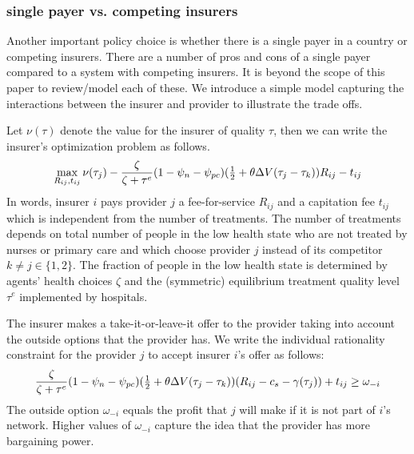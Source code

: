 \documentclass[12pt,english,a4paper]{article}
\begin{document}
\subsubsection{single payer vs. competing insurers}
\label{sec:orgcf517af}

Another important policy choice is whether there is a single payer in a country or competing insurers. There are a number of pros and cons of a single payer compared to a system with competing insurers. It is beyond the scope of this paper to review/model each of these. We introduce a simple model capturing the interactions between the insurer and provider to illustrate the trade offs.

Let \(\nu(\tau)\) denote the value for the insurer of quality \(\tau\), then we can write the insurer's optimization problem as follows.
\begin{equation}
\label{eq:36a}
\max_{R_{ij},t_{ij}} \nu(\tau_j) - \frac{\zeta}{\zeta+\tau^e}(1-\psi_n-\psi_{pc}) (\textstyle{1\over 2}+\theta\Delta V(\tau_j-\tau_k) )R_{ij} - t_{ij}
\end{equation}
In words, insurer \(i\) pays provider \(j\) a fee-for-service \(R_{ij}\) and a capitation fee \(t_{ij}\) which is independent from the number of treatments. The number of treatments depends on total number of people in the low health state who are not treated by nurses or primary care and which choose provider \(j\) instead of its competitor \(k \neq j \in \{1,2\}\). The fraction of people in the low health state is determined by agents' health choices \(\zeta\) and the (symmetric) equilibrium treatment quality level \(\tau^e\) implemented by hospitals.

The insurer makes a take-it-or-leave-it offer to the provider taking into account the outside options that the provider has. We write the individual rationality constraint for the provider \(j\) to accept insurer \(i\)'s offer as follows:
\begin{equation}
\label{eq:7}
\frac{\zeta}{\zeta+\tau^e}(1-\psi_n-\psi_{pc})( \textstyle{1\over 2} + \theta \Delta V (\tau_j - \tau_k))(R_{ij}-c_s-\gamma(\tau_j) ) + t_{ij} \geq \omega_{-i}
\end{equation}
The outside option \(\omega_{-i}\) equals the profit that \(j\) will make if it is not part of \(i\)'s network. Higher values of \(\omega_{-i}\) capture the idea that the provider has more bargaining power.
\end{document}

